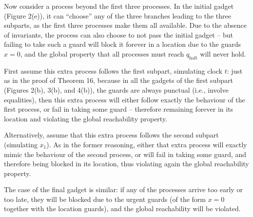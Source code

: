 \documentclass[10pt,a4paper]{article}
\begin{document}
 
 
Now consider a process beyond the first three processes. In the initial gadget (Figure 2(e)), it can “choose” any of the three branches leading to the three subparts, as the first three processes make them all available. Due to the absence of invariants, the process can also choose to not pass the initial gadget -- but failing to take such a guard will block it forever in a location due to the guards $x=0$, and the global property that all processes must reach $q_{\textrm{halt}}$ will never hold.\par
 
 
 
First assume this extra process follows the first subpart, simulating clock $t$: just as in the proof of Theorem 16, because in all the gadgets of the first subpart (Figures 2(b), 3(b), and 4(b)), the guards are always punctual (i.e., involve equalities), then this extra process will either follow exactly the behaviour of the first process, or fail in taking some guard -- therefore remaining forever in its location and violating the global reachability property.\par
 
 
 
Alternatively, assume that this extra process follows the second subpart (simulating $x_{1}$). As in the former reasoning, either that extra process will exactly mimic the behaviour of the second process, or will fail in taking some guard, and therefore being blocked in its location, thus violating again the global reachability property.\par
 
 
 
The case of the final gadget is similar: if any of the processes arrive too early or too late, they will be blocked due to the urgent guards (of the form $x=0$ together with the location guards), and the global reachability will be violated.\par
 
 
 
\end{document}
